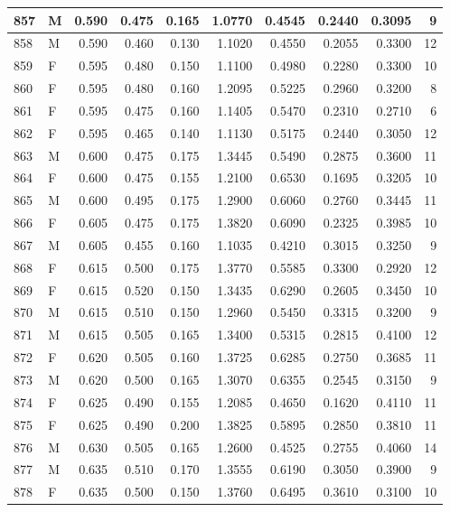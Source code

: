 \documentclass[9pt,twocolumn,twoside,]{pnas-new}
\begin{document}
\begin{tabular}{l|l|r|r|r|r|r|r|r|r}
\hline
857 & M & 0.590 & 0.475 & 0.165 & 1.0770 & 0.4545 & 0.2440 & 0.3095 & 9\\
\hline
858 & M & 0.590 & 0.460 & 0.130 & 1.1020 & 0.4550 & 0.2055 & 0.3300 & 12\\
\hline
859 & F & 0.595 & 0.480 & 0.150 & 1.1100 & 0.4980 & 0.2280 & 0.3300 & 10\\
\hline
860 & F & 0.595 & 0.480 & 0.160 & 1.2095 & 0.5225 & 0.2960 & 0.3200 & 8\\
\hline
861 & F & 0.595 & 0.475 & 0.160 & 1.1405 & 0.5470 & 0.2310 & 0.2710 & 6\\
\hline
862 & F & 0.595 & 0.465 & 0.140 & 1.1130 & 0.5175 & 0.2440 & 0.3050 & 12\\
\hline
863 & M & 0.600 & 0.475 & 0.175 & 1.3445 & 0.5490 & 0.2875 & 0.3600 & 11\\
\hline
864 & F & 0.600 & 0.475 & 0.155 & 1.2100 & 0.6530 & 0.1695 & 0.3205 & 10\\
\hline
865 & M & 0.600 & 0.495 & 0.175 & 1.2900 & 0.6060 & 0.2760 & 0.3445 & 11\\
\hline
866 & F & 0.605 & 0.475 & 0.175 & 1.3820 & 0.6090 & 0.2325 & 0.3985 & 10\\
\hline
867 & M & 0.605 & 0.455 & 0.160 & 1.1035 & 0.4210 & 0.3015 & 0.3250 & 9\\
\hline
868 & F & 0.615 & 0.500 & 0.175 & 1.3770 & 0.5585 & 0.3300 & 0.2920 & 12\\
\hline
869 & F & 0.615 & 0.520 & 0.150 & 1.3435 & 0.6290 & 0.2605 & 0.3450 & 10\\
\hline
870 & M & 0.615 & 0.510 & 0.150 & 1.2960 & 0.5450 & 0.3315 & 0.3200 & 9\\
\hline
871 & M & 0.615 & 0.505 & 0.165 & 1.3400 & 0.5315 & 0.2815 & 0.4100 & 12\\
\hline
872 & F & 0.620 & 0.505 & 0.160 & 1.3725 & 0.6285 & 0.2750 & 0.3685 & 11\\
\hline
873 & M & 0.620 & 0.500 & 0.165 & 1.3070 & 0.6355 & 0.2545 & 0.3150 & 9\\
\hline
874 & F & 0.625 & 0.490 & 0.155 & 1.2085 & 0.4650 & 0.1620 & 0.4110 & 11\\
\hline
875 & F & 0.625 & 0.490 & 0.200 & 1.3825 & 0.5895 & 0.2850 & 0.3810 & 11\\
\hline
876 & M & 0.630 & 0.505 & 0.165 & 1.2600 & 0.4525 & 0.2755 & 0.4060 & 14\\
\hline
877 & M & 0.635 & 0.510 & 0.170 & 1.3555 & 0.6190 & 0.3050 & 0.3900 & 9\\
\hline
878 & F & 0.635 & 0.500 & 0.150 & 1.3760 & 0.6495 & 0.3610 & 0.3100 & 10\\

\end{tabular}
\end{document}
